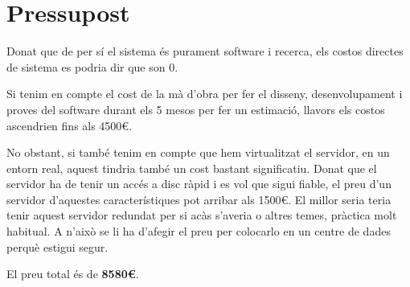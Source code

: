 \section{Pressupost}
{
    Donat que de per sí el sistema és purament software i recerca, els costos directes de sistema es podria dir
    que son 0.

    Si tenim en compte el cost de la mà d'obra per fer el disseny, desenvolupament i proves del software durant els
    5 mesos per fer un estimació, llavors els costos ascendrien fins als 4500\euro.
    

    No obstant, si també tenim en compte que hem virtualitzat el servidor, en un entorn real, aquest tindria també un
    cost bastant significatiu. Donat que el servidor ha de tenir un accés a disc ràpid i es vol que sigui fiable,
    el preu d'un servidor d'aquestes característiques pot arribar als 1500\euro. El millor seria teria tenir aquest servidor
    redundat per si acàs s'averia o altres temes, pràctica molt habitual. A n'això se li ha d'afegir el preu per
    colocarlo en un centre de dades perquè estigui segur.

    
    
    El preu total és de \textbf{8580\euro}.
}
